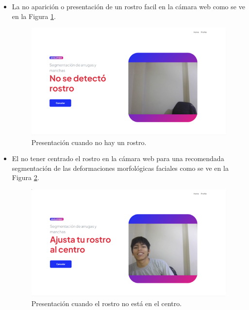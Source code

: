 \begin{itemize}
  \item La no aparición o presentación de un rostro facil en la cámara web como se ve en la Figura \ref{fig:sincam}.
\begin{figure}[H]
      \centering
      \includegraphics[width=1\textwidth]{4/figures/PresSinCam.png}
      \caption{Presentación cuando no hay un rostro.}
      \label{fig:sincam}
    \end{figure}
  \item El no tener centrado el rostro en la cámara web para una recomendada segmentación de las deformaciones morfológicas faciales como se ve en la Figura \ref{fig:presfueracam}.

\begin{figure}[H]
      \centering
      \includegraphics[width=1\textwidth]{4/figures/PresCamFuer.png}
      \caption{Presentación cuando el rostro no está en el centro.}
      \label{fig:presfueracam}
    \end{figure}
  \end{itemize}



